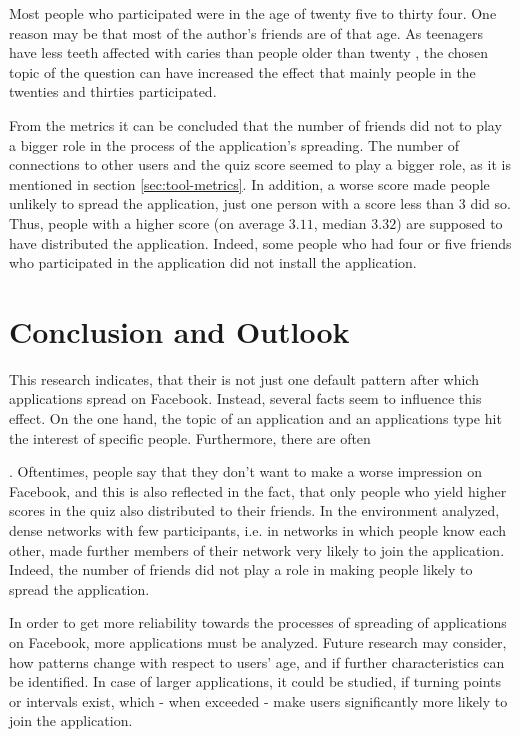 \documentclass[preprint,12pt]{elsarticle}
\begin{document}
Most people who participated were in the age of twenty five to thirty
four. One reason may be that most of the author's friends are of that
age. As teenagers have less teeth affected with
caries than people older than twenty \cite{zahngesundheit}, the chosen
topic of the question can have increased the effect that mainly people
in the twenties and thirties participated.

From the metrics it can be concluded that the number of friends did
not to play a bigger role in the 
process of the application's spreading. The number of connections
to other users and the quiz score seemed to play a bigger 
role, as it is mentioned in section \ref{sec:tool-metrics}. 
In addition, a worse score made people unlikely
to spread the application, just one person with a score less than 3
did so. Thus, people with a higher score (on average $3.11$, median $3.32$) are
supposed to have distributed the application. Indeed, some people who
had four or five friends who participated in the application did not
install the application.


\section{Conclusion and Outlook}
\label{sec:conclusion}
This research indicates, that their is not just one default pattern
after which applications spread on Facebook. Instead, several facts
seem to influence this effect. On the one hand, the topic of an
application and an applications type hit the interest of specific
people. Furthermore, there are often 

. Oftentimes, people say that they don't want to
make a worse impression on Facebook, and this is also reflected in the
fact, that only people who yield higher scores in the quiz also
distributed to their friends. In the environment analyzed, dense
networks with few participants, i.e. in networks in which people know
each other, made  further members of their network very likely to join
the application. Indeed, the number of friends did not play a role in
making people likely to spread the application.


In order to get more reliability towards the processes of spreading
of applications on Facebook, more applications must be analyzed.
Future research may consider, how patterns change with respect
to users' age, and if further characteristics can be identified. In
case of larger applications, it could be studied, if turning points
or intervals exist, which - when exceeded - make users significantly
more likely to join the application.
\end{document}
